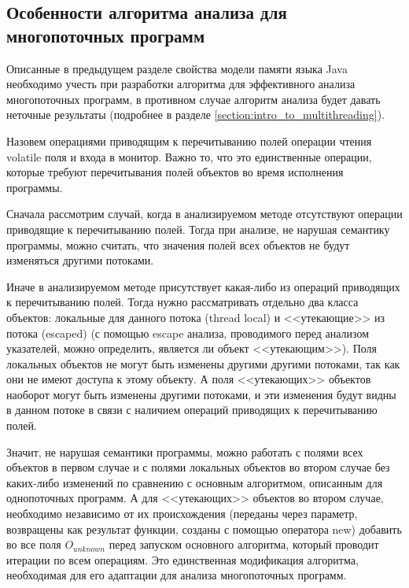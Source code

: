 \documentclass[14pt,titlepage]{extarticle}
\newcommand{\eng}[1]{{\English#1}}
\begin{document}
    \subsection{Особенности алгоритма анализа для многопоточных программ}
      \label{section:detailed_algorithm_for_multi}

      Описанные в предыдущем разделе свойства модели памяти языка Java
      необходимо учесть при разработки алгоритма для эффективного анализа
      многопоточных программ, в противном случае алгоритм анализа будет давать
      неточные результаты (подробнее в разделе
      \ref{section:intro_to_multithreading}).

      Назовем операциями приводящим к перечитыванию полей операции чтения
      \eng{volatile} поля и входа в монитор. Важно то, что это единственные
      операции, которые требуют перечитывания полей объектов во время
      исполнения программы.

      Сначала рассмотрим случай, когда в анализируемом методе отсутствуют
      операции приводящие к перечитыванию полей. Тогда при анализе, не нарушая
      семантику программы, можно считать, что значения полей всех объектов не
      будут изменяться другими потоками.

      Иначе в анализируемом методе присутствует какая-либо из операций
      приводящих к перечитыванию полей.
      Тогда нужно рассматривать отдельно два класса объектов: локальные для
      данного потока (\eng{thread local}) и <<утекающие>> из потока
      (\eng{escaped}) (с помощью \eng{escape} анализа, проводимого перед
      анализом указателей, можно определить, является ли объект <<утекающим>>).
      Поля локальных объектов не могут быть изменены другими другими потоками,
      так как они не имеют доступа к этому объекту. А поля <<утекающих>>
      объектов наоборот могут быть изменены другими потоками, и эти изменения
      будут видны в данном потоке в связи с наличием операций приводящих к
      перечитыванию полей.

      Значит, не нарушая семантики программы, можно работать с полями всех
      объектов в первом случае и с полями локальных объектов во втором случае
      без каких-либо изменений по сравнению с основным алгоритмом, описанным
      для однопоточных программ.
      А для <<утекающих>> объектов во втором случае, необходимо независимо от
      их происхождения (переданы через параметр, возвращены как результат
      функции, созданы с помощью оператора new) добавить во все поля
      $O_{unknown}$ перед запуском основного алгоритма, который проводит
      итерации по всем операциям.
      Это единственная модификация алгоритма, необходимая для его адаптации для
      анализа многопоточных программ.
\end{document}

